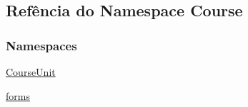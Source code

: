 \hypertarget{namespaceCourse}{\subsection{Refência do Namespace Course}
\label{namespaceCourse}
}
\subsubsection*{Namespaces}
\begin{DoxyCompactItemize}
\item 
\hyperlink{namespaceCourse_1_1CourseUnit}{Course\-Unit}
\item 
\hyperlink{namespaceCourse_1_1forms}{forms}
\end{DoxyCompactItemize}
